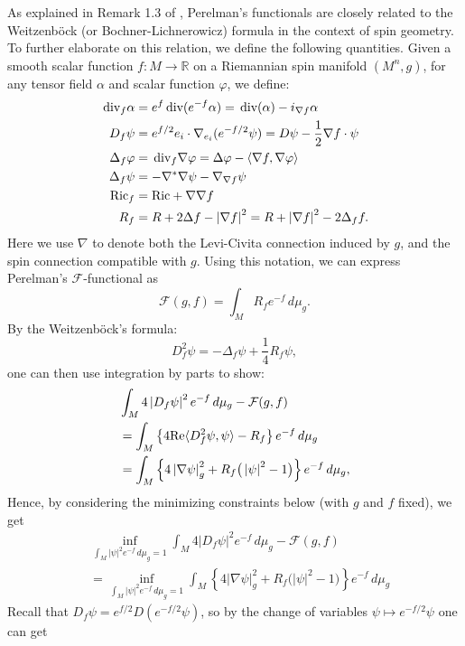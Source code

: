 \documentclass{amsart}
\theoremstyle{definition}
\theoremstyle{remark}
\numberwithin{equation}{section}
\newcommand{\abs}[1]{\left|#1\right|}
\newcommand{\Ric}{\textup{Ric}}
\newcommand{\R}{\mathbb{R}}
\renewcommand{\div}{\,\textup{div}}
\begin{document}
As explained in Remark 1.3 of \cite{Perelman}, Perelman's functionals are closely related to the Weitzenb\"ock (or  Bochner-Lichnerowicz) formula in the context of spin geometry. To further elaborate on this relation, we define the following quantities. Given a smooth scalar function $f : M \to \R$ on a Riemannian spin manifold $(M^n, g)$, for any tensor field $\alpha$ and scalar function $\varphi$, we define:
\begin{align*}
\div_f \alpha & = e^f \div(e^{-f}\alpha) = \div(\alpha) - i_{\nabla f}\alpha\\
D_f\psi & = e^{f/2} e_i \cdot \nabla_{e_i}(e^{-f/2}\psi) = D\psi - \frac{1}{2}\nabla f \cdot \psi\\
\Delta_f \varphi & = \div_f \nabla\varphi = \Delta\varphi - \langle \nabla f, \nabla\varphi\rangle\\
\Delta_f \psi & = -\nabla^*\nabla\psi - \nabla_{\nabla f}\psi \\
\Ric_f & = \Ric + \nabla\nabla f\\
R_f  & = R + 2\Delta f - \abs{\nabla f}^2 = R + \abs{\nabla f}^2 - 2\Delta_f f.
\end{align*}
Here we use $\nabla$ to denote both the Levi-Civita connection induced by $g$, and the spin connection compatible with $g$. Using this notation, we can express Perelman's $\mathcal{F}$-functional as
\[\mathcal{F}(g,f) = \int_M R_f e^{-f}\,d\mu_g.\]
By the Weitzenb\"ock's formula:
\[D_f^2 \psi = -\Delta_f \psi + \frac{1}{4}R_f \psi,\]
one can then use integration by parts to show:
\begin{align}
\label{eq:BO-function}
& \int_M 4\abs{D_f\psi}^2 e^{-f}\,d\mu_g - \mathcal{F}(g,f) \\
& = \int_M \left\{4\textup{Re}\langle D_f^2\psi, \psi\rangle - R_f\right\} e^{-f}\,d\mu_g \nonumber \\
& = \int_M \left\{4\abs{\nabla\psi}_g^2 + R_f\big(\abs{\psi}^2 - 1\big) \right\}e^{-f}\,d\mu_g \nonumber,
\end{align}
Hence, by considering the minimizing constraints below (with $g$ and $f$ fixed), we get
\begin{align*}
& \inf_{\int_M \abs{\psi}^2 e^{-f}\,d\mu_g = 1}\int_M 4\abs{D_f\psi}^2 e^{-f}\,d\mu_g - \mathcal{F}(g,f) \\
& = \inf_{\int_M \abs{\psi}^2 e^{-f}\,d\mu_g = 1}\int_M \left\{4\abs{\nabla\psi}_g^2 + R_f\big(\abs{\psi}^2 - 1\big) \right\}e^{-f}\,d\mu_g
\end{align*}
Recall that $D_f\psi = e^{f/2} D(e^{-f/2}\psi)$, so by the change of variables $\psi \mapsto e^{-f/2}\psi$ one can get
\end{document}
